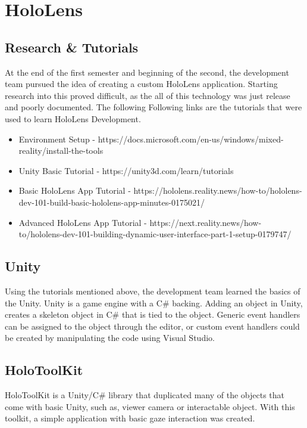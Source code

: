 \section{HoloLens}

    \subsection{Research & Tutorials}

    At the end of the first semester and beginning of the second, the development team pursued the idea of creating a custom HoloLens application.
    Starting research into this proved difficult, as the all of this technology was just release and poorly documented. The following
    Following links are the tutorials that were used to learn HoloLens Development.

    \begin{itemize}
        \item Environment Setup - https://docs.microsoft.com/en-us/windows/mixed-reality/install-the-tools
        \item Unity Basic Tutorial - https://unity3d.com/learn/tutorials
        \item Basic HoloLens App Tutorial - https://hololens.reality.news/how-to/hololens-dev-101-build-basic-hololens-app-minutes-0175021/
        \item Advanced HoloLens App Tutorial - https://next.reality.news/how-to/hololens-dev-101-building-dynamic-user-interface-part-1-setup-0179747/
    \end{itemize}

    \subsection{Unity}
    Using the tutorials mentioned above, the development team learned the basics of the Unity. Unity is a game engine with a C\# backing.
    Adding an object in Unity, creates a skeleton object in C\# that is tied to the object. Generic event handlers can be assigned to the object through
    the editor, or custom event handlers could be created by manipulating the code using Visual Studio. 

    \subsection{HoloToolKit}
    HoloToolKit is a Unity/C\# library that duplicated many of the objects that come with basic Unity, such as, viewer camera or interactable object.
    With this toolkit, a simple application with basic gaze interaction was created.
    
